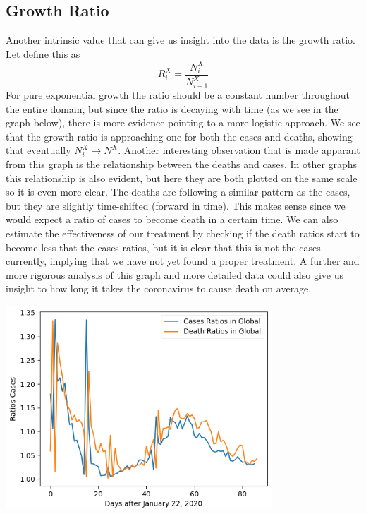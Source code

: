 \documentclass{report}
\begin{document}
        \subsection{Growth Ratio}
        Another intrinsic value that can give us insight into the data is the growth ratio. Let define this as
        \begin{equation}
            R^X_i = \dfrac{N^X_i}{N^X_{i - 1}}
        \end{equation}
        For pure exponential growth the ratio should be a constant number throughout the entire domain, but since the ratio is decaying with time (as we see in the graph below), there is more evidence pointing to a more logistic approach. We see that the growth ratio is approaching one for both the cases and deaths, showing that eventually $N^X_i \rightarrow N^X$.
        \newline
        \indent Another interesting observation that is made apparant from this graph is the relationship between the deaths and cases. In other graphs this relationship is also evident, but here they are both plotted on the same scale so it is even more clear. The deaths are following a similar pattern as the cases, but they are slightly time-shifted (forward in time). This makes sense since we would expect a ratio of cases to become death in a certain time.
        \newline
        \indent We can also estimate the effectiveness of our treatment by checking if the death ratios start to become less that the cases ratios, but it is clear that this is not the cases currently, implying that we have not yet found a proper treatment.
        \newline
        \indent A further and more rigorous analysis of this graph and more detailed data could also give us insight to how long it takes the coronavirus to cause death on average.
        \begin{center}
            \includegraphics[width=10cm]{plots/global/growth_ratios.png}
        \end{center}
\end{document}
